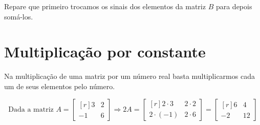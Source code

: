 \centerline{\footnotesize{Repare que primeiro trocamos os sinais dos elementos da matriz $B$ para depois somá-los.}}

\section{Multiplicação por constante}

Na multiplicação de uma matriz por um número real basta multiplicarmos cada um de seus elementos pelo número.

$$
\text{Dada a matriz }A=\begin{bmatrix*}[r]
3 & 2 \\ -1 & 6
\end{bmatrix*}\Rightarrow2A=\begin{bmatrix*}[r]
2 \cdot 3 & 2 \cdot 2 \\ 2 \cdot (-1) & 2 \cdot 6
\end{bmatrix*}=\begin{bmatrix*}[r]
6 & 4 \\ -2 & 12
\end{bmatrix*}
$$

